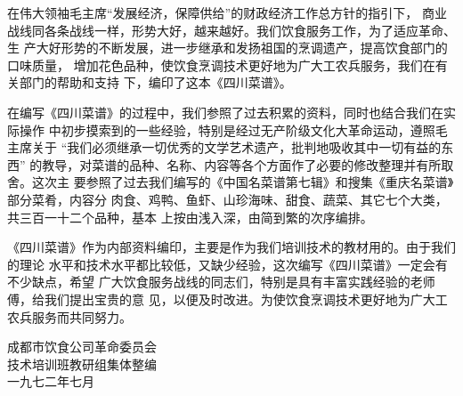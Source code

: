 \begin{center}
\Large\bfseries
{}%
\end{center}

在伟大领袖毛主席{\sffamily“发展经济，保障供给”}的财政经济工作总方针的指引下，
商业战线同各条战线一样，形势大好，越来越好。我们饮食服务工作，为了适应革命、生
产大好形势的不断发展，进一步继承和发扬祖国的烹调遗产，提高饮食部门的口味质量，
增加花色品种，使饮食烹调技术更好地为广大工农兵服务，我们在有关部门的帮助和支持
下，编印了这本《四川菜谱》。

在编写《四川菜谱》的过程中，我们参照了过去积累的资料，同时也结合我们在实际操作
中初步摸索到的一些经验，特别是经过无产阶级文化大革命运动，遵照毛主席关于%
{\sffamily“我们必须继承一切优秀的文学艺术遗产，批判地吸收其中一切有益的东西”}%
的教导，对菜谱的品种、名称、内容等各个方面作了必要的修改整理并有所取舍。这次主
要参照了过去我们编写的《中国名菜谱第七辑》和搜集《重庆名菜谱》部分菜肴，内容分
肉食、鸡鸭、鱼虾、山珍海味、甜食、蔬菜、其它七个大类，共三百一十二个品种，基本
上按由浅入深，由简到繁的次序编排。

《四川菜谱》作为内部资料编印，主要是作为我们培训技术的教材用的。由于我们的理论
水平和技术水平都比较低，又缺少经验，这次编写《四川菜谱》一定会有不少缺点，希望
广大饮食服务战线的同志们，特别是具有丰富实践经验的老师傅，给我们提出宝贵的意
见，以便及时改进。为使饮食烹调技术更好地为广大工农兵服务而共同努力。

\begin{flushright}
成都市饮食公司革命委员会%
	\mbox{\hspace{2em}}\\
技术培训班教研组集体整编%
	\mbox{\hspace{2em}}\\
一九七二年七月%
	\mbox{\hspace{4em}}
\end{flushright}

